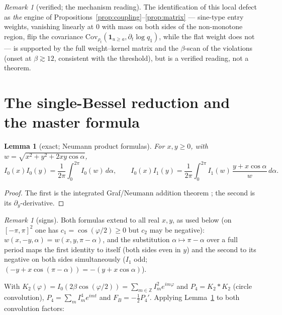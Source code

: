 \documentclass[11pt]{article}
\newtheorem{lemma}[theorem]{Lemma}
\theoremstyle{remark}
\newtheorem{remark}[theorem]{Remark}
\newcommand{\FB}{F_{\!B}}
\newcommand{\dd}{\,d}
\begin{document}
\begin{remark}[verified; the mechanism reading]
The identification of this local defect as \emph{the} engine of
Propositions~\ref{prop:coupling}--\ref{prop:matrix} --- sine-type entry
weights, vanishing linearly at $0$ with mass on both sides of the
non-monotone region, flip the covariance
$\mathrm{Cov}_{\rho_t}(\mathbf 1_{u\ge a},\partial_t\log q_1)$, while the
flat weight does not --- is supported by the full weight--kernel matrix
and the $\beta$-scan of the violations (onset at $\beta\gtrsim12$,
consistent with the threshold), but is a verified reading, not a theorem.
\end{remark}

\section{The single-Bessel reduction and the master formula}
\label{sec:reduction}

\begin{lemma}[exact; Neumann product formulas]\label{lem:neumann}
For $x,y\ge0$, with $w=\sqrt{x^2+y^2+2xy\cos\alpha}$,
\[
I_0(x)I_0(y)=\frac{1}{2\pi}\int_0^{2\pi} I_0(w)\dd\alpha,
\qquad
I_0(x)I_1(y)=\frac{1}{2\pi}\int_0^{2\pi} I_1(w)\,\frac{y+x\cos\alpha}{w}
\dd\alpha .
\]
\end{lemma}

\begin{proof}
The first is the integrated Graf/Neumann addition theorem
\cite[\S10.23(ii)]{DLMF}; the second is its $\partial_y$-derivative.
\end{proof}

\begin{remark}[signs]\label{rem:signs}
Both formulas extend to all real $x,y$, as used below (on
$[-\pi,\pi]^2$ one has $c_1=\cos(\varphi/2)\ge0$ but $c_2$ may be
negative): $w(x,-y,\alpha)=w(x,y,\pi-\alpha)$, and the substitution
$\alpha\mapsto\pi-\alpha$ over a full period maps the first identity to
itself (both sides even in $y$) and the second to its negative on both
sides simultaneously ($I_1$ odd; $(-y+x\cos(\pi-\alpha))=
-(y+x\cos\alpha)$).
\end{remark}

With $K_2(\varphi)=I_0(2\beta\cos(\varphi/2))=\sum_{m\in\mathbb Z}I_m^2
e^{im\varphi}$ and $P_4=K_2*K_2$ (circle convolution),
$P_4=\sum_{m}I_m^4e^{imt}$ and $\FB=-\tfrac12P_4'$. Applying
Lemma~\ref{lem:neumann} to both convolution factors:
\end{document}
